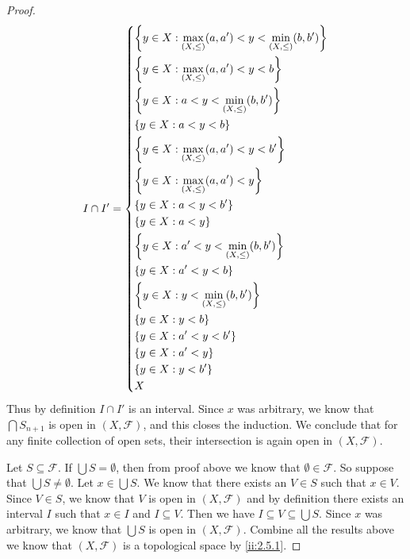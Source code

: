 \begin{proof}
  \[
    I \cap I' = \begin{dcases}
      \left\lbrace y \in X : \max_{(X, \leq)}(a, a') < y < \min_{(X, \leq)}(b, b')\right\rbrace \\
      \left\lbrace y \in X : \max_{(X, \leq)}(a, a') < y < b\right\rbrace                       \\
      \left\lbrace y \in X : a < y < \min_{(X, \leq)}(b, b')\right\rbrace                       \\
      \left\lbrace y \in X : a < y < b\right\rbrace                                             \\
      \left\lbrace y \in X : \max_{(X, \leq)}(a, a') < y < b'\right\rbrace                      \\
      \left\lbrace y \in X : \max_{(X, \leq)}(a, a') < y\right\rbrace                           \\
      \left\lbrace y \in X : a < y < b'\right\rbrace                                            \\
      \left\lbrace y \in X : a < y\right\rbrace                                                 \\
      \left\lbrace y \in X : a' < y < \min_{(X, \leq)}(b, b')\right\rbrace                      \\
      \left\lbrace y \in X : a' < y < b\right\rbrace                                            \\
      \left\lbrace y \in X : y < \min_{(X, \leq)}(b, b')\right\rbrace                           \\
      \left\lbrace y \in X : y < b\right\rbrace                                                 \\
      \left\lbrace y \in X : a' < y < b'\right\rbrace                                           \\
      \left\lbrace y \in X : a' < y\right\rbrace                                                \\
      \left\lbrace y \in X : y < b'\right\rbrace                                                \\
      X
    \end{dcases}
  \]
  Thus by definition \(I \cap I'\) is an interval.
  Since \(x\) was arbitrary, we know that \(\bigcap S_{n + 1}\) is open in \((X, \mathcal{F})\), and this closes the induction.
  We conclude that for any finite collection of open sets, their intersection is again open in \((X, \mathcal{F})\).

  Let \(S \subseteq \mathcal{F}\).
  If \(\bigcup S = \emptyset\), then from proof above we know that \(\emptyset \in \mathcal{F}\).
  So suppose that \(\bigcup S \neq \emptyset\).
  Let \(x \in \bigcup S\).
  We know that there exists an \(V \in S\) such that \(x \in V\).
  Since \(V \in S\), we know that \(V\) is open in \((X, \mathcal{F})\) and by definition there exists an interval \(I\) such that \(x \in I\) and \(I \subseteq V\).
  Then we have \(I \subseteq V \subseteq \bigcup S\).
  Since \(x\) was arbitrary, we know that \(\bigcup S\) is open in \((X, \mathcal{F})\).
  Combine all the results above we know that \((X, \mathcal{F})\) is a topological space by \cref{ii:2.5.1}.


\end{proof}
